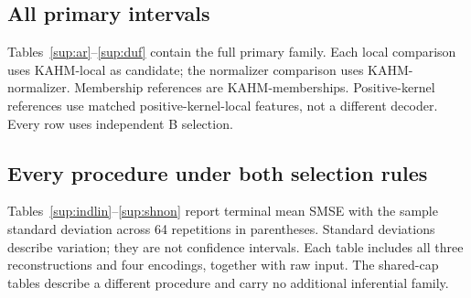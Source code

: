 \subsection{All primary intervals}
Tables~\ref{sup:ar}--\ref{sup:duf} contain the full primary family. Each local comparison uses KAHM-local as candidate; the normalizer comparison uses KAHM-normalizer. Membership references are KAHM-memberships. Positive-kernel references use matched positive-kernel-local features, not a different decoder. Every row uses independent B selection.

\begin{table}[htbp]\centering\small\setlength{\tabcolsep}{3pt}
\caption{Linear autoregression: all ten primary comparisons. Gain is positive when the candidate mean is lower. The adjusted interval and $\bar d$ use absolute SMSE units.}\label{sup:ar}

\end{table}
\begin{table}[htbp]\centering\small\setlength{\tabcolsep}{3pt}
\caption{Nonlinear autoregression: all ten primary comparisons. All directions remain unresolved under the specified interval calculation.}\label{sup:nar}

\end{table}
\FloatBarrier
\begin{table}[htbp]\centering\small\setlength{\tabcolsep}{3pt}
\caption{Van der Pol: all ten primary comparisons. Favorable raw-input results do not imply superiority over every reconstruction control.}\label{sup:vdp}

\end{table}
\begin{table}[htbp]\centering\small\setlength{\tabcolsep}{3pt}
\caption{Duffing: all ten primary comparisons, including the adverse nonlinear-decoder outcomes.}\label{sup:duf}

\end{table}
\FloatBarrier

\subsection{Every procedure under both selection rules}
Tables~\ref{sup:indlin}--\ref{sup:shnon} report terminal mean SMSE with the sample standard deviation across 64 repetitions in parentheses. Standard deviations describe variation; they are not confidence intervals. Each table includes all three reconstructions and four encodings, together with raw input. The shared-cap tables describe a different procedure and carry no additional inferential family.

